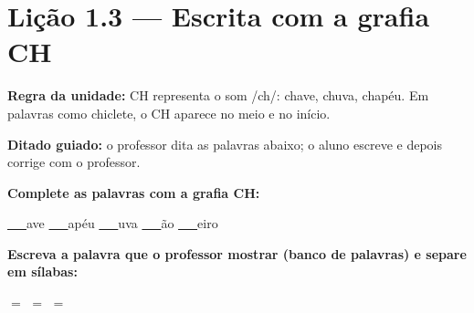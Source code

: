 \section{Lição 1.3 --- Escrita com a grafia CH}

\noindent\textbf{Regra da unidade:} CH representa o som /ch/: chave, chuva, chapéu. Em palavras como chiclete, o CH aparece no meio e no início.


\noindent\textbf{Ditado guiado:} o professor dita as palavras abaixo; o aluno escreve e depois corrige com o professor.

\begin{center}
  \underline{\hspace{2.3cm}} \quad \underline{\hspace{2.3cm}} \quad \underline{\hspace{2.3cm}} \quad \underline{\hspace{2.3cm}}

  \underline{\hspace{2.3cm}} \quad \underline{\hspace{2.3cm}} \quad \underline{\hspace{2.3cm}} \quad \underline{\hspace{2.3cm}}
\end{center}

\noindent\textbf{Complete as palavras com a grafia CH:}
\begin{center}
  \underline{~~~}ave \quad \underline{~~~}apéu \quad \underline{~~~}uva \quad \underline{~~~}ão \quad \underline{~~~}eiro
\end{center}

\noindent\textbf{Escreva a palavra que o professor mostrar (banco de palavras) e separe em sílabas:}

\begin{center}
  \underline{\hspace{2cm}} $=$ \underline{\hspace{2cm}} \quad \underline{\hspace{2cm}} $=$ \underline{\hspace{2cm}} \quad \underline{\hspace{2cm}} $=$ \underline{\hspace{2cm}}
  \end{center}




